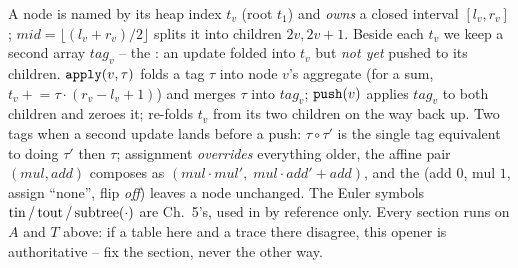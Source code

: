 A node is named by its heap index \(t_v\) (root \(t_1\)) and \emph{owns} a closed
interval \([l_v,r_v]\); \(\mathit{mid}=\lfloor(l_v{+}r_v)/2\rfloor\) splits it into
children \(2v,2v{+}1\).  Beside each \(t_v\) we keep a second array
\(\mathit{tag}_v\) -- the : an update folded into \(t_v\)
but \emph{not yet} pushed to its children.   \(\texttt{apply}(v,\tau)\)
folds a tag \(\tau\) into node \(v\)'s aggregate (for a sum, \(t_v\mathrel{+}=
\tau\cdot(r_v-l_v{+}1)\)) and merges \(\tau\) into \(\mathit{tag}_v\); 
\(\texttt{push}(v)\) applies \(\mathit{tag}_v\) to both children and zeroes it;
 re-folds \(t_v\) from its two children on the way back up.  Two tags
 when a second update lands before a push: \(\tau\circ\tau'\) is the
single tag equivalent to doing \(\tau'\) then \(\tau\); assignment
\emph{overrides} everything older, the affine pair \((\mathit{mul},\mathit{add})\)
composes as \((\mathit{mul}\cdot\mathit{mul}',\;\mathit{mul}\cdot\mathit{add}'
+\mathit{add})\), and the  (add \(0\), mul \(1\), assign
``none'', flip \emph{off}\(\)) leaves a node unchanged.  The Euler symbols
\(\operatorname{tin}/\operatorname{tout}/\operatorname{subtree}(\cdot)\) are Ch.~5's, used in  by
reference only.  Every section runs on \(A\) and \(T\) above: if a table here and
a trace there disagree, this opener is authoritative -- fix the section, never the
other way.
